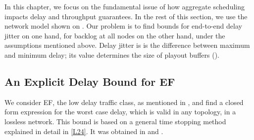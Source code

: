 In this chapter, we focus on the fundamental issue of how
aggregate scheduling impacts delay and throughput guarantees. In
the rest of this section, we use the network model shown on
. Our problem is to find bounds for
end-to-end delay jitter on one hand, for backlog at all nodes on
the other hand, under the assumptions mentioned above. Delay
jitter is is the difference between maximum and minimum delay; its
value determines the size of playout buffers
().



\subsection{An Explicit Delay Bound for EF}

We consider EF, the low delay traffic class, as mentioned in
, and find a closed form expression for the worst
case delay, which is valid in any topology, in a lossless network.
This bound is based on a general time stopping method explained in
detail in \cref{L24}. It was obtained in \cite{qofis2000} and
\cite{jiang01}.

